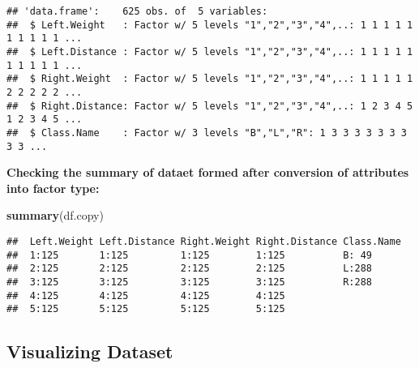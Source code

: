 \documentclass[
]{article}
\newenvironment{Shaded}{\begin{snugshade}}{\end{snugshade}}
\newcommand{\KeywordTok}[1]{\textcolor[rgb]{0.13,0.29,0.53}{\textbf{#1}}}
\newcommand{\NormalTok}[1]{#1}
\newcommand{\OperatorTok}[1]{\textcolor[rgb]{0.81,0.36,0.00}{\textbf{#1}}}
\newcommand{\StringTok}[1]{\textcolor[rgb]{0.31,0.60,0.02}{#1}}
\begin{document}
\begin{Shaded}
\end{Shaded}

\begin{verbatim}
## 'data.frame':    625 obs. of  5 variables:
##  $ Left.Weight   : Factor w/ 5 levels "1","2","3","4",..: 1 1 1 1 1 1 1 1 1 1 ...
##  $ Left.Distance : Factor w/ 5 levels "1","2","3","4",..: 1 1 1 1 1 1 1 1 1 1 ...
##  $ Right.Weight  : Factor w/ 5 levels "1","2","3","4",..: 1 1 1 1 1 2 2 2 2 2 ...
##  $ Right.Distance: Factor w/ 5 levels "1","2","3","4",..: 1 2 3 4 5 1 2 3 4 5 ...
##  $ Class.Name    : Factor w/ 3 levels "B","L","R": 1 3 3 3 3 3 3 3 3 3 ...
\end{verbatim}

\textbf{Checking the summary of dataet formed after conversion of
attributes into factor type:}

\begin{Shaded}
\begin{Highlighting}[]
\KeywordTok{summary}\NormalTok{(df.copy)}
\end{Highlighting}
\end{Shaded}

\begin{verbatim}
##  Left.Weight Left.Distance Right.Weight Right.Distance Class.Name
##  1:125       1:125         1:125        1:125          B: 49     
##  2:125       2:125         2:125        2:125          L:288     
##  3:125       3:125         3:125        3:125          R:288     
##  4:125       4:125         4:125        4:125                    
##  5:125       5:125         5:125        5:125
\end{verbatim}

\hypertarget{visualizing-dataset}{%
\subsection{\texorpdfstring{\textbf{Visualizing Dataset
}}{Visualizing Dataset }}\label{visualizing-dataset}}
\end{document}
